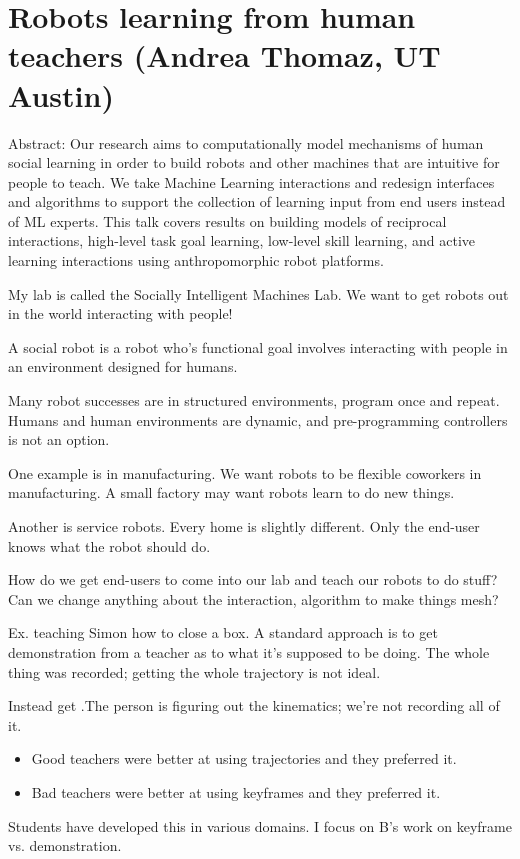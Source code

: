 \section{Robots learning from human teachers (Andrea Thomaz, UT Austin)}

Abstract: Our research aims to computationally model mechanisms of human social learning in order to build robots and other machines that are intuitive for people to teach. We take Machine Learning interactions and redesign interfaces and algorithms to support the collection of learning input from end users instead of ML experts. This talk covers results on building models of reciprocal interactions, high-level task goal learning, low-level skill learning, and active learning interactions using anthropomorphic robot platforms.


My lab is called the Socially Intelligent Machines Lab. We want to get robots out in the world interacting with people!

A social robot is a robot who's functional goal involves interacting with people in an environment designed for humans.

Many robot successes are in structured environments, program once and repeat. Humans and human environments are dynamic, and pre-programming controllers is not an option.

One example is in manufacturing. We want robots to be flexible coworkers in manufacturing. A small factory may want robots learn to do new things. 

Another is service robots. Every home is slightly different. Only the end-user knows what the robot should do.

How do we get end-users to come into our lab and teach our robots to do stuff?
Can we change anything about the interaction, algorithm to make things mesh?

Ex. teaching Simon how to close a box. A standard approach is to get demonstration from a teacher as to what it's supposed to be doing.
The whole thing was recorded; getting the whole trajectory is not ideal.

Instead get .The person is figuring out the kinematics; we're not recording all of it.

\begin{itemize}
\item
Good teachers were better at using trajectories and they preferred it.
\item
Bad teachers were better at using keyframes and they preferred it.
\end{itemize}
Students have developed this in various domains. I focus on B's work on keyframe vs. demonstration.

